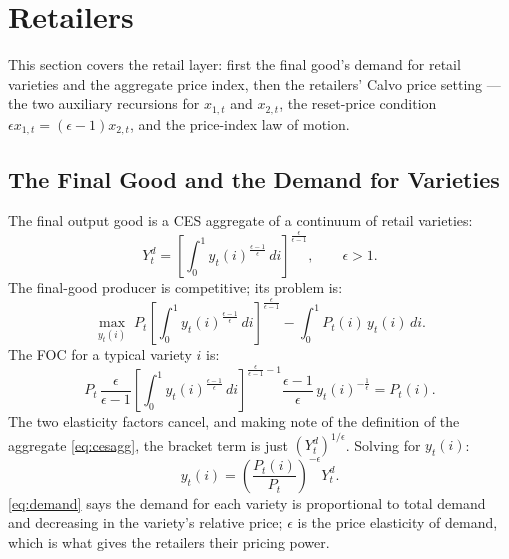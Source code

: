 \documentclass[11pt]{article}
\begin{document}
\section{Retailers}\label{sec:pricing}

This section covers the retail layer: first the final good's demand for retail
varieties and the aggregate price index, then the retailers' Calvo price
setting --- the two auxiliary recursions for $x_{1,t}$ and $x_{2,t}$, the
reset-price condition $\epsilon x_{1,t} = (\epsilon-1)x_{2,t}$, and the
price-index law of motion.

\subsection{The Final Good and the Demand for Varieties}

The final output good is a CES aggregate of a continuum of retail varieties:
\begin{equation}\label{eq:cesagg}
    Y_t^{d} = \left[\int_0^1 y_t(i)^{\frac{\epsilon-1}{\epsilon}}\,di
    \right]^{\frac{\epsilon}{\epsilon-1}}, \qquad \epsilon > 1.
\end{equation}
The final-good producer is competitive; its problem is:
\begin{equation*}
    \max_{y_t(i)} \; P_t \left[\int_0^1
    y_t(i)^{\frac{\epsilon-1}{\epsilon}}\,di\right]^{\frac{\epsilon}{\epsilon-1}}
    - \int_0^1 P_t(i)\, y_t(i)\, di.
\end{equation*}
The FOC for a typical variety $i$ is:
\begin{equation*}
    P_t\,\frac{\epsilon}{\epsilon-1}\left[\int_0^1
    y_t(i)^{\frac{\epsilon-1}{\epsilon}}\,di\right]^{\frac{\epsilon}{\epsilon-1}-1}
    \frac{\epsilon-1}{\epsilon}\, y_t(i)^{-\frac{1}{\epsilon}} = P_t(i).
\end{equation*}
The two elasticity factors cancel, and making note of the definition of the
aggregate \eqref{eq:cesagg}, the bracket term is just
$\left(Y_t^{d}\right)^{1/\epsilon}$. Solving for $y_t(i)$:
\begin{equation}\label{eq:demand}
    y_t(i) = \left(\frac{P_t(i)}{P_t}\right)^{-\epsilon} Y_t^{d}.
\end{equation}
\eqref{eq:demand} says the demand for each variety is proportional to total
demand and decreasing in the variety's relative price; $\epsilon$ is the price
elasticity of demand, which is what gives the retailers their pricing power.
\end{document}
